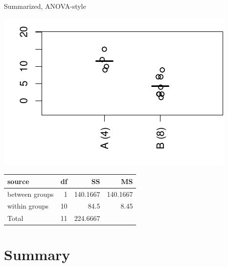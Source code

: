 \begin{frame}{Summarized, ANOVA-style}

  \begin{center}
    \includegraphics{dots4ex.pdf}

    \vspace{2em}

    \begin{tabular}{lrrr}
      source & df & SS & MS \\
      \hline
      between groups & 1 & 140.1667 & 140.1667 \\
      within groups & 10 & 84.5 & 8.45 \\
      \hline
      Total & 11 & 224.6667 &  \\
    \end{tabular}

  \end{center}

\end{frame}

% 
% 

\section<article>{Summary}
